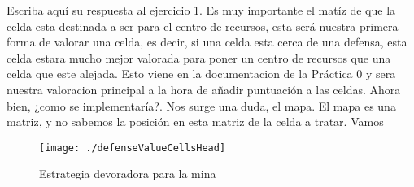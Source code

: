 Escriba aquí su respuesta al ejercicio 1. 
    Es muy importante el matíz de que la celda esta destinada a ser para el centro de recursos, esta será nuestra primera forma de valorar
una celda, es decir, si una celda esta cerca de una defensa, esta celda estara mucho mejor valorada para poner un centro de recursos que 
una celda que este alejada. Esto viene en la documentacion de la Práctica 0 y sera nuestra valoracion principal a la hora de añadir puntuación
a las celdas. 
    Ahora bien, ¿como se implementaría?. Nos surge una duda, el mapa. El mapa es una matriz, y no sabemos la posición en esta matriz de la celda
a tratar. Vamos 

\begin{figure}
\centering
\texttt{[image: ./defenseValueCellsHead]} %
\caption{Estrategia devoradora para la mina}
\label{fig:defenseValueCellsHead}
\end{figure}